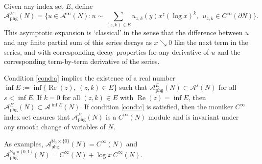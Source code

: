 \documentclass[11pt]{article}
\DeclareMathOperator{\Real}{Re}
\theoremstyle{plain}
\theoremstyle{definition}
\theoremstyle{remark}
\def\Nm{{\mathbb{N}}}
\def\A{\mathcal{A}}
\newcommand{\del}{\partial}
\begin{document}
Given any index set $E$, define
\begin{equation*}
\A_{\mathrm{phg}}^E(N) = \biggl\{u \in \A^\infty(N): u \sim \sum_{(z,k) \in E} u_{z,k}(y) x^z (\log x)^k,\ \ u_{z,k} \in C^\infty(\del N) \biggr\}.
\end{equation*}
This asymptotic expansion is `classical' in the sense that the difference between $u$ and any finite partial sum of this series decays as $x \searrow 0$
like the next term in the series, and with corresponding decay properties for any derivative of $u$ and the corresponding term-by-term derivative of the series.

Condition \eqref{cond:a} implies the existence of a real number $\inf E := \inf \{\Real (z),\ (z,k)\in E\}$ such that $\A_{\mathrm{phg}}^E(N)\subset \A^s(N)$
for all $s<\inf E$. If $k=0$ for all $(z,k)\in E$ with $\Real(z) = \inf E$, then $\A_{\mathrm{phg}}^E(N) \subset \A^{\inf E}(N)$.
If condition \eqref{cond:c} is satisfied, then the moniker $C^\infty$ index set ensures that $\A_{\mathrm{phg}}^E(N)$ is a $C^\infty(N)$ module and is
invariant under any smooth change of variables of $N$.

As examples, $\A_{\mathrm{phg}}^{\Nm_0\times \{0\}}(N) = C^\infty(N)$ and $\A_{\mathrm{phg}}^{\Nm_0\times \{0,1\}}(N) = C^\infty(N)+\log x \, C^\infty(N)$.
\end{document}
